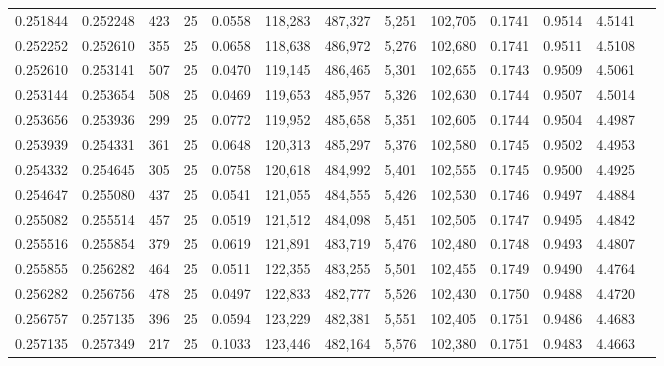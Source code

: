 \begin{tabular}{rrrrrrrrrrrrr}
0.251844 & 0.252248 &   423 &  25 &                                     0.0558 & 118,283 & 487,327 &   5,251 & 102,705 & 0.1741 & 0.9514 & 4.5141 \\
0.252252 & 0.252610 &   355 &  25 &                                     0.0658 & 118,638 & 486,972 &   5,276 & 102,680 & 0.1741 & 0.9511 & 4.5108 \\
0.252610 & 0.253141 &   507 &  25 &                                     0.0470 & 119,145 & 486,465 &   5,301 & 102,655 & 0.1743 & 0.9509 & 4.5061 \\
0.253144 & 0.253654 &   508 &  25 &                                     0.0469 & 119,653 & 485,957 &   5,326 & 102,630 & 0.1744 & 0.9507 & 4.5014 \\
0.253656 & 0.253936 &   299 &  25 &                                     0.0772 & 119,952 & 485,658 &   5,351 & 102,605 & 0.1744 & 0.9504 & 4.4987 \\
0.253939 & 0.254331 &   361 &  25 &                                     0.0648 & 120,313 & 485,297 &   5,376 & 102,580 & 0.1745 & 0.9502 & 4.4953 \\
0.254332 & 0.254645 &   305 &  25 &                                     0.0758 & 120,618 & 484,992 &   5,401 & 102,555 & 0.1745 & 0.9500 & 4.4925 \\
0.254647 & 0.255080 &   437 &  25 &                                     0.0541 & 121,055 & 484,555 &   5,426 & 102,530 & 0.1746 & 0.9497 & 4.4884 \\
0.255082 & 0.255514 &   457 &  25 &                                     0.0519 & 121,512 & 484,098 &   5,451 & 102,505 & 0.1747 & 0.9495 & 4.4842 \\
0.255516 & 0.255854 &   379 &  25 &                                     0.0619 & 121,891 & 483,719 &   5,476 & 102,480 & 0.1748 & 0.9493 & 4.4807 \\
0.255855 & 0.256282 &   464 &  25 &                                     0.0511 & 122,355 & 483,255 &   5,501 & 102,455 & 0.1749 & 0.9490 & 4.4764 \\
0.256282 & 0.256756 &   478 &  25 &                                     0.0497 & 122,833 & 482,777 &   5,526 & 102,430 & 0.1750 & 0.9488 & 4.4720 \\
0.256757 & 0.257135 &   396 &  25 &                                     0.0594 & 123,229 & 482,381 &   5,551 & 102,405 & 0.1751 & 0.9486 & 4.4683 \\
0.257135 & 0.257349 &   217 &  25 &                                     0.1033 & 123,446 & 482,164 &   5,576 & 102,380 & 0.1751 & 0.9483 & 4.4663 \\

\end{tabular}
